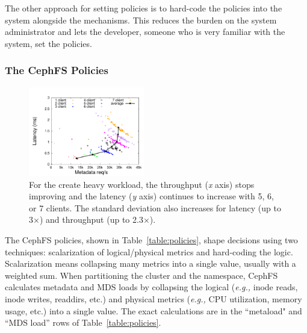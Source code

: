 The other approach for setting policies is to hard-code the policies into the system alongside the mechanisms. This reduces the burden on the system administrator and lets the developer, someone who is very familiar with the system, set the policies. 

\subsubsection*{The CephFS Policies}
\label{the-cephfs-policies}
\begin{figure}[tb]
	\centering
	\includegraphics[width=0.45\textwidth]{./chapters/mantle/figures/creates-latency-thruput-clients.pdf}
    \caption{For the create heavy workload, the throughput ({\it x} axis) stops improving and the latency ({\it y} axis) continues to increase with 5, 6, or 7 clients. The standard deviation also increases for latency (up to 3\(\times\)) and throughput (up to 2.3\(\times\)). \label{figure:creates-latency-thruput-clients}} 
\end{figure}

The CephFS policies, shown in Table~\ref{table:policies}, shape decisions using two techniques: scalarization of logical/physical metrics and hard-coding the logic. Scalarization means collapsing many metrics into a single value, usually with a weighted sum. When partitioning the cluster and the namespace, CephFS calculates metadata and MDS loads by collapsing the logical ({\it e.g.,} inode reads, inode writes, readdirs, etc.) and physical metrics ({\it e.g.,} CPU utilization, memory usage, etc.) into a single value. The exact calculations are in the ``metaload" and ``MDS load'' rows of Table~\ref{table:policies}. 

